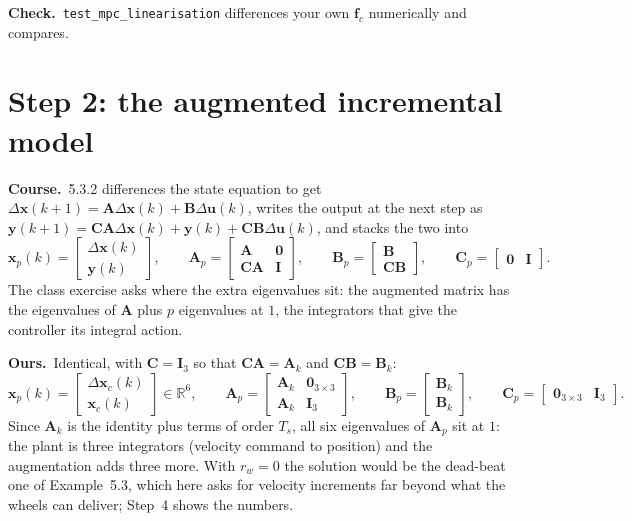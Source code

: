 \documentclass[11pt,a4paper]{article}
\newcommand{\vect}[1]{\bm{#1}}
\newcommand{\mat}[1]{\bm{#1}}
\newcommand{\Real}{\mathbb{R}}
\newcommand{\du}{\Delta\vect{u}}
\newcommand{\Ts}{T_s}
\newcommand{\course}{\textbf{\textcolor{blue!60!black}{Course.}}\ }
\newcommand{\ours}{\textbf{\textcolor{green!45!black}{Ours.}}\ }
\newcommand{\tcheck}{\textbf{Check.}\ }
\begin{document}
\tcheck \texttt{test\_mpc\_linearisation} differences your own $\vect f_c$ numerically and compares.

\section{Step 2: the augmented incremental model}
\course 5.3.2 differences the state equation to get $\Delta\vect x(k+1) = \mat A\Delta\vect x(k) + \mat B\du(k)$, writes the output at the next step as $\vect y(k+1) = \mat C\mat A\Delta\vect x(k) + \vect y(k) + \mat C\mat B\du(k)$, and stacks the two into
\begin{equation}
\vect x_p(k) = \begin{bmatrix}\Delta\vect x(k)\\ \vect y(k)\end{bmatrix},\qquad
\mat A_p = \begin{bmatrix}\mat A & \mat 0\\ \mat C\mat A & \mat I\end{bmatrix},\qquad
\mat B_p = \begin{bmatrix}\mat B\\ \mat C\mat B\end{bmatrix},\qquad
\mat C_p = \begin{bmatrix}\mat 0 & \mat I\end{bmatrix}.
\end{equation}
The class exercise asks where the extra eigenvalues sit: the augmented matrix has the eigenvalues of $\mat A$ plus $p$ eigenvalues at $1$, the integrators that give the controller its integral action.

\ours Identical, with $\mat C = \mat I_3$ so that $\mat C\mat A = \mat A_k$ and $\mat C\mat B = \mat B_k$:
\begin{equation}
\vect x_p(k) = \begin{bmatrix}\Delta\vect x_c(k)\\ \vect x_c(k)\end{bmatrix}\in\Real^6,\qquad
\mat A_p = \begin{bmatrix}\mat A_k & \mat 0_{3\times3}\\ \mat A_k & \mat I_3\end{bmatrix},\qquad
\mat B_p = \begin{bmatrix}\mat B_k\\ \mat B_k\end{bmatrix},\qquad
\mat C_p = \begin{bmatrix}\mat 0_{3\times3} & \mat I_3\end{bmatrix}.
\end{equation}
Since $\mat A_k$ is the identity plus terms of order $\Ts$, all six eigenvalues of $\mat A_p$ sit at $1$: the plant is three integrators (velocity command to position) and the augmentation adds three more. With $r_w = 0$ the solution would be the dead-beat one of Example~5.3, which here asks for velocity increments far beyond what the wheels can deliver; Step~4 shows the numbers.
\end{document}
